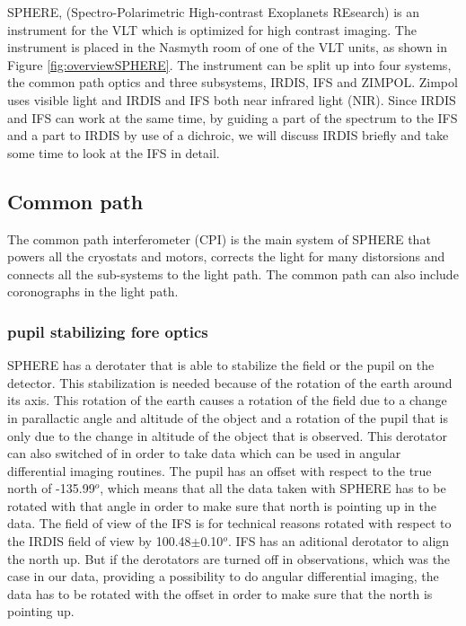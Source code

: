 \documentclass[twoside,single]{lion-msc}
\begin{document}
SPHERE, (Spectro-Polarimetric High-contrast Exoplanets REsearch) is an instrument for the VLT which is optimized for high contrast imaging. The instrument is placed in the Nasmyth room of one of the VLT units, as shown in Figure \ref{fig:overviewSPHERE}. The instrument can be split up into four systems, the common path optics and three subsystems, IRDIS, IFS and ZIMPOL. Zimpol uses visible light and IRDIS and IFS both near infrared light (NIR). Since IRDIS and IFS can work at the same time, by guiding a part of the spectrum to the IFS and a part to IRDIS by use of a dichroic, we will discuss IRDIS briefly and take some time to look at the IFS in detail.

\subsection{Common path}
The common path interferometer (CPI) is the main system of SPHERE that powers all the cryostats and motors, corrects the light for many distorsions and connects all the sub-systems to the light path. The common path can also include coronographs in the light path. 

\subsubsection{pupil stabilizing fore optics}
SPHERE has a derotater that is able to stabilize the field or the pupil on the detector. This stabilization is needed because of the rotation of the earth around its axis. This rotation of the earth causes a rotation of the field due to a change in parallactic angle and altitude of the object and a rotation of the pupil that is only due to the change in altitude of the object that is observed. This derotator can also switched of in order to take data which can be used in angular differential imaging routines. The pupil has an offset with respect to the true north of -135.99$^o$, which means that all the data taken with SPHERE has to be rotated with that angle in order to make sure that north is pointing up in the data. The field of view of the IFS is for technical reasons rotated with respect to the IRDIS field of view by 100.48$\pm$0.10$^o$. IFS has an aditional derotator to align the north up. But if the derotators are turned off in observations, which was the case in our data, providing a possibility to do angular differential imaging, the data has to be rotated with the offset in order to make sure that the north is pointing up. %
\bigskip
\end{document}

